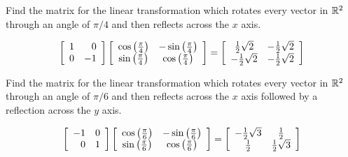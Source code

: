 \begin{enumialphparenastyle}
\begin{ex} Find the matrix for the linear transformation which rotates every
vector in $\mathbb{R}^{2}$ through an angle of $\pi /4$ and then reflects
across the $x$ axis.
\begin{sol}
\[
\left[
\begin{array}{rr}
1 & 0 \\
0 & -1
\end{array}
\right] \left[
\begin{array}{cc}
\cos \left( \frac{\pi }{4}\right)  & -\sin \left( \frac{\pi }{4}\right)  \\
\sin \left( \frac{\pi }{4}\right)  & \cos \left( \frac{\pi }{4}\right)
\end{array}
\right]  =  \left[
\begin{array}{cc}
\frac{1}{2}\sqrt{2} & -\frac{1}{2}\sqrt{2} \\
-\frac{1}{2}\sqrt{2} & -\frac{1}{2}\sqrt{2}
\end{array}
\right]
\]
\end{sol}
\end{ex}

\begin{ex} Find the matrix for the linear transformation which rotates every
vector in $\mathbb{R}^{2}$ through an angle of $\pi /6$ and then reflects
across the $x$ axis followed by a reflection across the $y$ axis.
\begin{sol}
\[
\left[
\begin{array}{rr}
-1 & 0 \\
0 & 1
\end{array}
\right] \left[
\begin{array}{cc}
\cos \left( \frac{\pi }{6}\right)  & -\sin \left( \frac{\pi }{6}\right)  \\
\sin \left( \frac{\pi }{6}\right)  & \cos \left( \frac{\pi }{6}\right)
\end{array}
\right] = \left[
\begin{array}{cc}
-\frac{1}{2}\sqrt{3} & \frac{1}{2} \\
\frac{1}{2} & \frac{1}{2}\sqrt{3}
\end{array}
\right]
\]
\end{sol}
\end{ex}


\end{enumialphparenastyle}
